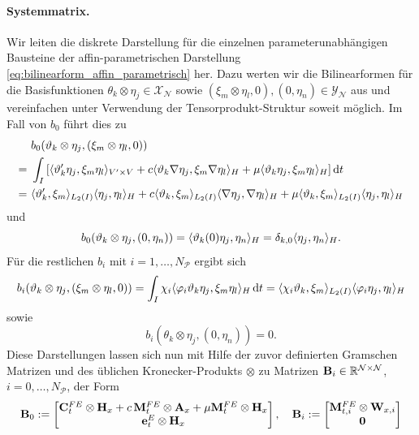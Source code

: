 \documentclass[../main.tex]{subfiles}
\begin{document}
\paragraph{Systemmatrix.} %
\label{par:systemmatrix}

Wir leiten die diskrete Darstellung für die einzelnen parameterunabhängigen Bausteine der affin-parametrischen Darstellung \cref{eq:bilinearform_affin_parametrisch} her.
Dazu werten wir die Bilinearformen für die Basisfunktionen $\theta_{k} \otimes \eta_{j} \in \mathcal X_{\mathcal N}$ sowie $(\xi_{m} \otimes \eta_{l}, 0), (0, \eta_{n}) \in \mathcal Y_{\mathcal N}$ aus und vereinfachen unter Verwendung der Tensorprodukt-Struktur soweit möglich.
Im Fall von $b_{0}$ führt dies zu
\begin{align}
    \phantom{=}&~ b_{0}(\vartheta_{k} \otimes \eta_{j}, (\xi_{m} \otimes \eta_{l}, 0))
    \\=&~ \int_{I} \left[ \langle\vartheta_{k}' \eta_{j},\xi_{m} \eta_{l}\rangle_{V' \times V} + c \langle\vartheta_{k} \nabla \eta_{j},\xi_{m} \nabla \eta_{l}\rangle_{H} + \mu \langle\vartheta_{k} \eta_{j},\xi_{m} \eta_{l}\rangle_{H} \right] \mathop{}\!\mathrm{d} t
    \\=&~ \langle\vartheta_{k}',\xi_{m}\rangle_{L_{2}(I)} \langle\eta_{j},\eta_{l}\rangle_{H} + c \langle\vartheta_{k},\xi_{m}\rangle_{L_{2}(I)}\langle\nabla \eta_{j},\nabla \eta_{l}\rangle_{H} + \mu \langle\vartheta_{k},\xi_{m}\rangle_{L_{2}(I)} \langle\eta_{j},\eta_{l}\rangle_{H}
\end{align}
und
\begin{equation}
    b_{0}(\vartheta_{k} \otimes \eta_{j}, (0, \eta_{n}))
    = \langle\vartheta_{k}(0) \eta_{j},\eta_{n}\rangle_{H}
    = \delta_{k, 0} \langle\eta_{j},\eta_{n}\rangle_{H}.
\end{equation}
Für die restlichen $b_{i}$ mit $i = 1, \dots, N_{\mathcal P}$ ergibt sich
\begin{equation}
    b_{i}(\vartheta_{k} \otimes \eta_{j}, (\xi_{m} \otimes \eta_{l}, 0))
    = \int_{I} \chi_{i} \langle\varphi_{i} \vartheta_{k} \eta_{j},\xi_{m} \eta_{l}\rangle_{H} \mathop{}\!\mathrm{d} t
    = \langle\chi_{i} \vartheta_{k},\xi_{m}\rangle_{L_{2}(I)} \langle\varphi_{i} \eta_{j},\eta_{l}\rangle_{H}
\end{equation}
sowie
\begin{equation}
    b_{i}(\theta_{k} \otimes \eta_{j}, (0, \eta_{n})) = 0.
\end{equation}
Diese Darstellungen lassen sich nun mit Hilfe der zuvor definierten Gramschen Matrizen und des üblichen Kronecker-Produkts $\otimes$ zu Matrizen $\mathbf{B}_{i} \in \mathbb{R}^{\mathcal N \times \mathcal N}$, $i = 0, \dots, N_{\mathcal P}$, der Form
\begin{equation}
    \mathbf{B}_{0} := \begin{bmatrix}
    \mathbf{C}_{t}^{FE} \otimes \mathbf{H}_{x} + c\,\mathbf{M}_{t}^{FE} \otimes \mathbf{A}_{x} + \mu \mathbf{M}_{t}^{FE} \otimes \mathbf{H}_{x} \\
    \mathbf{e}_{t}^{E} \otimes \mathbf{H}_{x}
    \end{bmatrix},
    \quad
    \mathbf{B}_{i} :=  \begin{bmatrix}
    \mathbf{M}_{t,i}^{FE} \otimes \mathbf{W}_{x,i} \\
    \mathbf{0}
    \end{bmatrix}
\end{equation}
\end{document}
